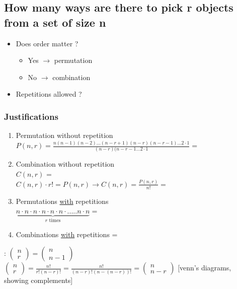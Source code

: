 \documentclass[12pt,a4paper]{article}
\begin{document}
\subsection{How many ways are there to pick r objects from a set of size n}
\begin{boiteV}{0.6}
\begin{itemize}
	\item Does order matter ?
	\begin{itemize}
		\item Yes $\to$ permutation
		\item No $\to$ combination
	\end{itemize}
	\item Repetitions allowed ?
\end{itemize}
\end{boiteV}

\subsubsection{Justifications}
\begin{enumerate}
	\item Permutation without repetition\\
		$P(n,r) = \frac{n(n-1)(n-2)...(n-r+1)(n-r)(n-r-1)...2\cdot1}{(n-r)(n-r-1...2\cdot 1} = $
	\item Combination without repetition\\
		$C(n,r)$ = \\
		$C(n,r)\cdot r! = P(n,r) \to C(n,r) = \frac{P(n,r)}{n!} = $
	\item Permutations \underline{with} repetitions\\
			$\underbrace{n\cdot n \cdot n\cdot n \cdot n\cdot n \cdot .....n\cdot n }_{r \mbox{ times}} =$ 
	\item Combinations \underline{with} repetitions = 
\end{enumerate}
 : 
$\begin{pmatrix}
	n\\
	r
\end{pmatrix}
= 
\begin{pmatrix} 
	n\\ 
	n-1
\end{pmatrix}$\\
 $\begin{pmatrix}
n\\
r
\end{pmatrix}
= \frac{n!}{r!(n-r)!} = \frac{n!}{(n-r)!(n-(n-r))!} = 
\begin{pmatrix}
n\\
n-r
\end{pmatrix}$ [venn's diagrams, showing complements]
\end{document}
